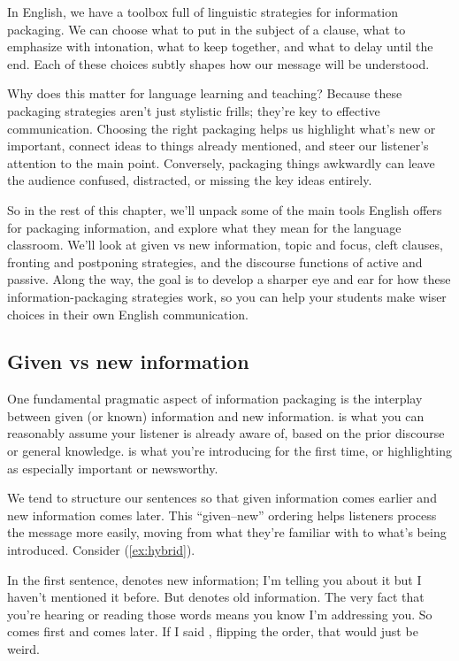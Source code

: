 In English, we have a toolbox full of linguistic strategies for information packaging. We can choose what to put in the subject of a clause, what to emphasize with intonation, what to keep together, and what to delay until the end. Each of these choices subtly shapes how our message will be understood.

Why does this matter for language learning and teaching? Because these packaging strategies aren't just stylistic frills; they're key to effective communication. Choosing the right packaging helps us highlight what's new or important, connect ideas to things already mentioned, and steer our listener's attention to the main point. Conversely, packaging things awkwardly can leave the audience confused, distracted, or missing the key ideas entirely.

So in the rest of this chapter, we'll unpack some of the main tools English offers for packaging information, and explore what they mean for the language classroom. We'll look at given vs new information, topic and focus, cleft clauses, fronting and postponing strategies, and the discourse functions of active and passive. Along the way, the goal is to develop a sharper eye and ear for how these information-packaging strategies work, so you can help your students make wiser choices in their own English communication.

\subsection{Given vs new information}

One fundamental pragmatic aspect of information packaging is the interplay between given (or known) information and new information.  is what you can reasonably assume your listener is already aware of, based on the prior discourse or general knowledge.  is what you're introducing for the first time, or highlighting as especially important or newsworthy.

We tend to structure our sentences so that given information comes earlier and new information comes later. This \enquote{given--new} ordering helps listeners process the message more easily, moving from what they're familiar with to what's being introduced. Consider (\ref{ex:hybrid}).

\label{ex:hybrid}
\z
In the first sentence,  denotes new information; I'm telling you about it but I haven't mentioned it before. But  denotes old information. The very fact that you're hearing or reading those words means you know I'm addressing you. So  comes first and  comes later. If I said , flipping the order, that would just be weird.

